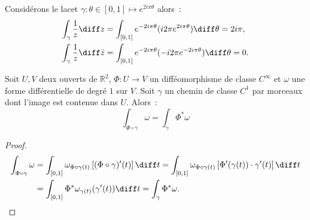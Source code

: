 \begin{exem} Considérons le lacet $\gamma \colon \theta \in [0,1] \mapsto e^{2 i \pi \theta}$ alors~:
\begin{align*}
\int_\gamma \frac{1}{z} \diff z &= \int_{[0,1]} e^{-2 i \pi \theta}( i 2 \pi e^{2 i \pi \theta}) \diff \theta = 2 i \pi,\\
\int_\gamma \frac{1}{z} \diff \bar{z} &= \int_{[0,1]} e^{-2 i \pi \theta}(-i 2 \pi e^{-2 i \pi \theta}) \diff \theta = 0.
\end{align*}
\end{exem}
%



\begin{fprop}
Soit $U, V$ deux ouverts de $\mathbb{R}^2$, $\Phi \colon U \to V$ un difféomorphisme
de classe $C^\infty$ et $\omega$ une forme différentielle
de degré $1$ sur $V$. Soit $\gamma$ un chemin de classe $C^1$ par morceaux
dont l'image est contenue dans $U$. Alors~:
\[
\int_{\Phi \circ \gamma} \omega = \int_{\gamma} \Phi^\ast \omega
\]
\end{fprop}

\begin{proof}
\begin{align*}
\int_{\Phi \circ \gamma} \omega & = \int_{[0,1]} \omega_{\Phi \circ \gamma (t)} \left[(\Phi \circ \gamma)^\prime (t) \right] \diff t =\int_{[0,1]} \omega_{\Phi \circ \gamma (t)} \left[\Phi^\prime(\gamma(t)) \cdot \gamma^\prime(t) \right] \diff t \\
&= \int_{[0,1]} \Phi^\ast \omega_{\gamma(t)} (\gamma^\prime(t)) \diff t = \int_\gamma \Phi^\ast \omega.
\end{align*}
\end{proof}





